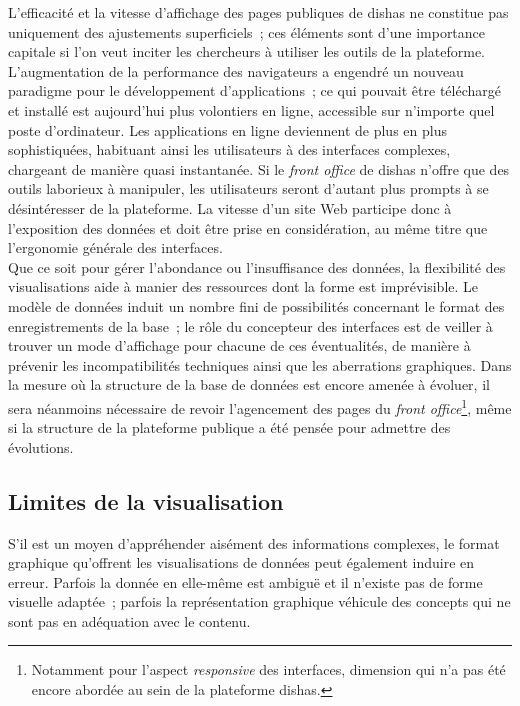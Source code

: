 \documentclass[a4paper,12pt,twoside]{book}
\newcommand{\eng}{\emph}
\newcommand{\bdd}{base de données\xspace}
\newcommand{\fo}{\eng{front office}\xspace}
\newcommand{\dishas}{\gls{dishas}\xspace}
\begin{document}
L'efficacité et la vitesse d'affichage des pages publiques de \dishas ne constitue pas uniquement des ajustements superficiels~; ces éléments sont d'une importance capitale si l'on veut inciter les chercheurs à utiliser les outils de la plateforme. L'augmentation de la performance des navigateurs a engendré un nouveau paradigme pour le développement d'applications~; ce qui pouvait être téléchargé et installé est aujourd'hui plus volontiers en ligne, accessible sur n'importe quel poste d'ordinateur. Les applications en ligne deviennent de plus en plus sophistiquées, habituant ainsi les utilisateurs à des interfaces complexes, chargeant de manière quasi instantanée. Si le \fo de \dishas n'offre que des outils laborieux à manipuler, les utilisateurs seront d'autant plus prompts à se désintéresser de la plateforme. La vitesse d'un site Web participe donc à l'exposition des données et doit être prise en considération, au même titre que l'ergonomie générale des interfaces.\\

Que ce soit pour gérer l'abondance ou l'insuffisance des données, la flexibilité des visualisations aide à manier des ressources dont la forme est imprévisible. Le modèle de données induit un nombre fini de possibilités concernant le format des enregistrements de la base~; le rôle du concepteur des interfaces est de veiller à trouver un mode d'affichage pour chacune de ces éventualités, de manière à prévenir les incompatibilités techniques ainsi que les aberrations graphiques. Dans la mesure où la structure de la \bdd est encore amenée à évoluer, il sera néanmoins nécessaire de revoir l'agencement des pages du \fo\footnote{Notamment pour l'aspect \eng{responsive} des interfaces, dimension qui n'a pas été encore abordée au sein de la plateforme \dishas.}, même si la structure de la plateforme publique a été pensée pour admettre des évolutions.

		\subsection{Limites de la visualisation}
S'il est un moyen d'appréhender aisément des informations complexes, le format graphique qu'offrent les visualisations de données peut également induire en erreur. Parfois la donnée en elle-même est ambiguë et il n'existe pas de forme visuelle adaptée~; parfois la représentation graphique véhicule des concepts qui ne sont pas en adéquation avec le contenu.
\end{document}
